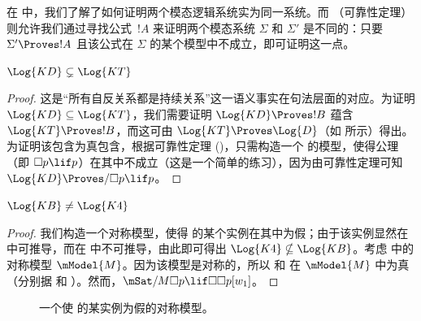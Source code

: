 \documentclass[../../../include/open-logic-section]{subfiles}
\begin{document}


在  中，我们了解了如何证明两个模态逻辑系统实为同一系统。而 （可靠性定理）则允许我们通过寻找公式~$!A$ 来证明两个模态系统 $\Sigma$ 和 $\Sigma'$ 是不同的：只要 $\Sigma' \Proves !A$ 且该公式在 $\Sigma$ 的某个模型中不成立，即可证明这一点。

\begin{prop}
  $\Log{KD} \subsetneq \Log{KT}$
\end{prop}

\begin{proof}
  这是“所有自反关系都是持续关系”这一语义事实在句法层面的对应。为证明 $\Log{KD} \subseteq \Log{KT}$，我们需要证明 $\Log{KD} \Proves !B$ 蕴含 $\Log{KT} \Proves !B$，而这可由 $\Log{KT} \Proves \Log{D}$（如  所示）得出。为证明该包含为真包含，根据可靠性定理 ()，只需构造一个  的模型，使得公理 （即 $\Box p \lif p$）在其中不成立（这是一个简单的练习），因为由可靠性定理可知 $\Log{KD} \Proves/ \Box p \lif p$。
\end{proof}

\begin{prop}
  $\Log{KB} \neq \Log{K4}$
\end{prop}

\begin{proof}
  我们构造一个对称模型，使得  的某个实例在其中为假；由于该实例显然在  中可推导，而在  中不可推导，由此即可得出 $\Log{K4} \nsubseteq \Log{KB}$。考虑  中的对称模型 $\mModel{M}$。因为该模型是对称的，所以  和  在 $\mModel{M}$ 中为真（分别据  和 ）。然而，$\mSat/{M}{\Box p \lif \Box\Box p}[w_1]$。
\end{proof}

\begin{figure}[htpb]
  \centering
  \caption{一个使  的某实例为假的对称模型。}
\end{figure}
\end{document}
